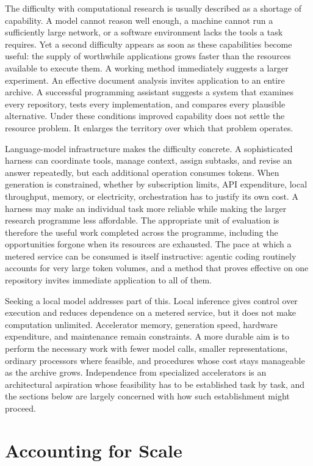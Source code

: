 \documentclass[11pt]{article}
\theoremstyle{remark}
\begin{document}
The difficulty with computational research is usually described as a shortage of capability. A model cannot reason well enough, a machine cannot run a sufficiently large network, or a software environment lacks the tools a task requires. Yet a second difficulty appears as soon as these capabilities become useful: the supply of worthwhile applications grows faster than the resources available to execute them. A working method immediately suggests a larger experiment. An effective document analysis invites application to an entire archive. A successful programming assistant suggests a system that examines every repository, tests every implementation, and compares every plausible alternative. Under these conditions improved capability does not settle the resource problem. It enlarges the territory over which that problem operates.

Language-model infrastructure makes the difficulty concrete. A sophisticated harness can coordinate tools, manage context, assign subtasks, and revise an answer repeatedly, but each additional operation consumes tokens. When generation is constrained, whether by subscription limits, API expenditure, local throughput, memory, or electricity, orchestration has to justify its own cost. A harness may make an individual task more reliable while making the larger research programme less affordable. The appropriate unit of evaluation is therefore the useful work completed across the programme, including the opportunities forgone when its resources are exhausted. The pace at which a metered service can be consumed is itself instructive: agentic coding routinely accounts for very large token volumes, and a method that proves effective on one repository invites immediate application to all of them.

Seeking a local model addresses part of this. Local inference gives control over execution and reduces dependence on a metered service, but it does not make computation unlimited. Accelerator memory, generation speed, hardware expenditure, and maintenance remain constraints. A more durable aim is to perform the necessary work with fewer model calls, smaller representations, ordinary processors where feasible, and procedures whose cost stays manageable as the archive grows. Independence from specialized accelerators is an architectural aspiration whose feasibility has to be established task by task, and the sections below are largely concerned with how such establishment might proceed.

\section{Accounting for Scale}
\end{document}
